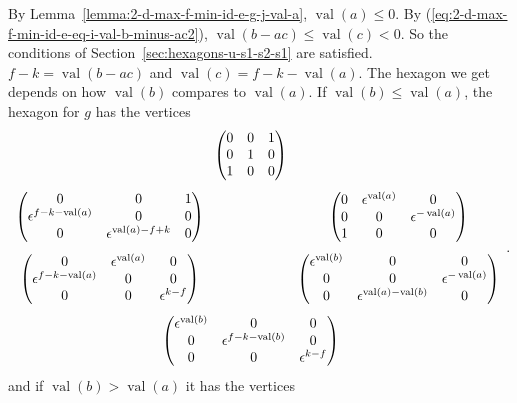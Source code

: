\documentclass{amsart}
\theoremstyle{definition}
\def\e{\epsilon}
\def\val{\mathop{\mathrm{val}}}
\def\s{\sigma}
\def\heximagessqueezed#1#2#3#4#5#6#7{
  \heximagessqueezedcarefully{#1}{2em}{#2}{#3}{#4}{#5}{#6}{#7}
}
\def\heximagessqueezedcarefully#1#2#3#4#5#6#7#8{
  \begin{array}{ccc}
    & #3 & \\[#2]
    #5 \hspace{-#1} & & \hspace{-#1} #4 \\[2em]
    #6 \hspace{-#1} & & \hspace{-#1} #7 \\[#2]
    & #8 &
  \end{array}
}
\begin{document}


  By Lemma~\ref{lemma:2-d-max-f-min-id-e-g-j-val-a}, $\val(a) \le 0$.  By
  (\ref{eq:2-d-max-f-min-id-e-eq-i-val-b-minus-ac2}), $\val(b-ac) \le \val(c) <
  0$.  So the conditions of Section~\ref{sec:hexagons-u-s1-s2-s1} are
  satisfied.  $f - k = \val(b-ac)$ and $\val(c) = f - k - \val(a)$.
  The hexagon we get depends on how $\val(b)$ compares to $\val(a)$.  If
  $\val(b) \le \val(a)$, the hexagon for $g$ has the vertices
  \begin{equation*}
    \heximagessqueezed{4em}
    	{\begin{pmatrix}
	    0 & 0 & 1 \\
	    0 & 1 & 0 \\
	    1 & 0 & 0 
	\end{pmatrix}}
	{\begin{pmatrix}
	    0 & \e^{\val(a)} & 0 \\
	    0 & 0 & \e^{-\val(a)}  \\
	    1 & 0 & 0
	\end{pmatrix}}
	{\begin{pmatrix}
	    0 & 0 & 1 \\
	    \e^{f - k - \val(a)}  & 0 & 0 \\
	    0 & \e^{\val(a) - f + k}  & 0
	\end{pmatrix}}
	{\begin{pmatrix}
	    0 & \e^{\val(a)} & 0 \\
	    \e^{f-k-\val(a)} & 0 & 0 \\
	    0 & 0 & \e^{k-f} 
	\end{pmatrix}}
	{\begin{pmatrix}
	    \e^{\val(b)}  & 0 & 0 \\
	    0 & 0 & \e^{-\val(a)} \\
	    0 & \e^{\val(a) - \val(b)} & 0  
	\end{pmatrix}}
	{\begin{pmatrix}
	    \e^{\val(b)} & 0 & 0 \\
	    0 & \e^{f-k-\val(b)} & 0 \\
	    0 & 0 & \e^{k-f} 
	\end{pmatrix}}.
  \end{equation*}
  and if $\val(b) > \val(a)$ it has the vertices
\end{document}
